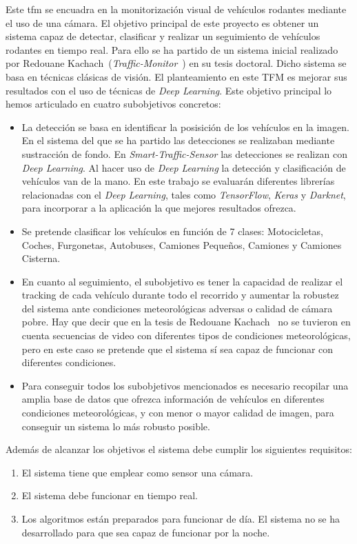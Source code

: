 Este \acrfull{tfm} se encuadra en la monitorización visual de vehículos rodantes mediante el uso de una cámara. El objetivo principal de este proyecto es obtener un sistema capaz de detectar, clasificar y realizar un seguimiento de vehículos rodantes en tiempo real. Para ello se ha partido de un sistema inicial realizado por Redouane Kachach~\cite{redo_tesis}(\textit{Traffic-Monitor}~\cite{traffic_monitor_redo}) en su tesis doctoral. Dicho sistema se basa en técnicas clásicas de visión. El planteamiento en este TFM es mejorar sus resultados con el uso de técnicas de \textit{Deep Learning}. Este objetivo principal lo hemos articulado en cuatro subobjetivos concretos:

\begin{itemize}
    \item La detección se basa en identificar la posisición de los vehículos en la imagen. En el sistema del que se ha partido las detecciones se realizaban mediante sustracción de fondo. En \textit{Smart-Traffic-Sensor} las detecciones se realizan con \textit{Deep Learning}. Al hacer uso de \textit{Deep Learning} la detección y clasificación de vehículos van de la mano. En este trabajo se evaluarán diferentes  librerías relacionadas con el \textit{Deep Learning}, tales como \textit{TensorFlow}, \textit{Keras} y \textit{Darknet}, para incorporar a la aplicación la que mejores resultados ofrezca.
    \item Se pretende clasificar los vehículos en función de 7 clases: Motocicletas, Coches, Furgonetas, Autobuses, Camiones Pequeños, Camiones y Camiones Cisterna. 
    \item En cuanto al seguimiento, el subobjetivo es tener la capacidad de realizar el tracking de cada vehículo durante todo el recorrido y aumentar la robustez del sistema ante condiciones meteorológicas adversas o calidad de cámara pobre. Hay que decir que en la tesis de Redouane Kachach~\cite{redo_tesis} no se tuvieron en cuenta secuencias de video con diferentes tipos de condiciones meteorológicas, pero en este caso se pretende que el sistema sí sea capaz de funcionar con diferentes condiciones.  
    \item Para conseguir todos los subobjetivos mencionados es necesario recopilar una amplia base de datos que ofrezca información de vehículos en diferentes condiciones meteorológicas, y con menor o mayor calidad de imagen, para conseguir un sistema lo más robusto posible.
\end{itemize}


Además de alcanzar los objetivos el sistema debe cumplir los siguientes requisitos:
\begin{enumerate}
    \item El sistema tiene que emplear como sensor una cámara.
    \item El sistema debe funcionar en tiempo real.
    \item  Los algoritmos están preparados para funcionar de día. El sistema no se ha desarrollado para que sea capaz de funcionar por la noche.
\end{enumerate}

